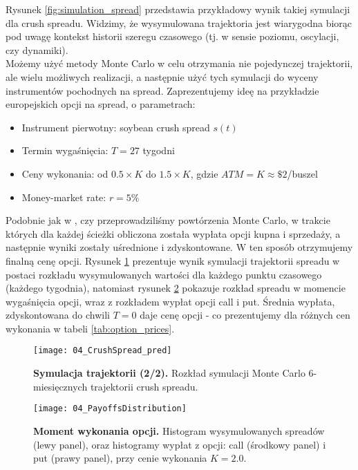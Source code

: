 Rysunek \ref{fig:simulation_spread} przedstawia przykładowy wynik takiej symulacji dla crush spreadu. Widzimy, że wysymulowana trajektoria jest wiarygodna biorąc pod uwagę kontekst historii szeregu czasowego (tj. w sensie poziomu, oscylacji, czy dynamiki).\\

Możemy użyć metody Monte Carlo w celu otrzymania nie pojedynczej trajektorii, ale wielu możliwych realizacji, a następnie użyć tych symulacji do wyceny instrumentów pochodnych na spread. Zaprezentujemy ideę na przykładzie europejskich opcji na spread, o parametrach:
\begin{itemize}
	\item Instrument pierwotny: soybean crush spread $s(t)$
	\item Termin wygaśnięcia: $T = 27$ tygodni
	\item Ceny wykonania: od $0.5\times K$ do $1.5\times K$, gdzie $ATM = K \approx\$2$/buszel
	\item Money-market rate: $r = 5\%$
\end{itemize}

Podobnie jak w \cite{Bernard_Pricing_Multivariate_Options_with_copulae}, czy  \cite{Herath_Copula_Crack_Spread} przeprowadziliśmy powtórzenia Monte Carlo, w trakcie których dla każdej ścieżki obliczona została wypłata opcji kupna i sprzedaży, a następnie wyniki zostały uśrednione i zdyskontowane. W ten sposób otrzymujemy finalną cenę opcji. 
Rysunek \ref{fig:simulation_monte_carlo} prezentuje wynik symulacji trajektorii spreadu w postaci rozkładu wysymulowanych wartości dla każdego punktu czasowego (każdego tygodnia), natomiast rysunek \ref{fig:payoffs_distribution} pokazuje rozkład spreadu w momencie wygaśnięcia opcji, wraz z rozkładem wypłat opcji call i put. Średnia wypłata, zdyskontowana do chwili $T=0$ daje cenę opcji - co prezentujemy dla różnych cen wykonania w tabeli \ref{tab:option_prices}.\\
\begin{figure}[h]
	\centering
	\texttt{[image: 04\_CrushSpread\_pred]}
	\caption{\textbf{Symulacja trajektorii (2/2).} Rozkład symulacji Monte Carlo $6$-miesięcznych trajektorii crush spreadu. \label{fig:simulation_monte_carlo}}
\end{figure}


\begin{figure}[h]
	\centering
	\texttt{[image: 04\_PayoffsDistribution]}
	\caption{\textbf{Moment wykonania opcji.} Histogram wysymulowanych spreadów (lewy panel), oraz histogramy wypłat z opcji: call (środkowy panel) i put (prawy panel), przy cenie wykonania $K=2.0$. \label{fig:payoffs_distribution}}
\end{figure}


